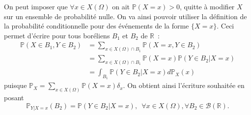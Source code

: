 On peut imposer que \(\forall x \in X(\Omega)\) on ait
\(\mathbb{P}(X=x) > 0\), quitte à modifier \(X\) sur un ensemble de
probabilité nulle. On va ainsi pouvoir utiliser la définition de la
probabilité conditionnelle pour des événements de la forme \(\{X =x\}\).
Ceci permet d'écrire pour tous boréliens \(B_1\) et \(B_2\) de
\(\mathbb{R}\)~: \begin{align*}
\mathbb{P}(X \in B_1, Y \in B_2) &= \sum_{x \in X(\Omega)\cap B_1} \mathbb{P}(X=x, Y\in B_2)\\
                         &= \sum_{x \in X(\Omega)\cap B_1} \mathbb{P}(X=x) \mathbb{P}(Y \in B_2 | X=x)\\
                         &= \int_{B_1} \mathbb{P}(Y \in B_2 | X=x) d\mathbb{P}_X(x)
\end{align*} puisque
\(\mathbb{P}_X = \sum_{x \in X(\Omega)} \mathbb{P}(X=x)\delta_x\). On
obtient ainsi l'écriture souhaitée en posant
\[\mathbb{P}_{Y|X=x}(B_2) = \mathbb{P}(Y \in B_2 | X=x),\,\,\,\forall x \in X(\Omega), \forall B_2\in\mathcal{B}(\mathbb{R}).\]

